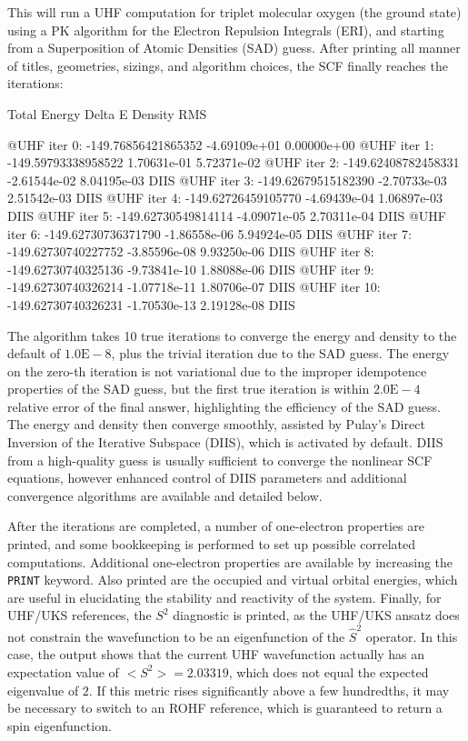 This will run a UHF computation for triplet molecular oxygen (the ground state)
using a PK algorithm for the Electron Repulsion Integrals (ERI), and starting
from a Superposition of Atomic Densities (SAD) guess. After printing all manner
of titles, geometries, sizings, and algorithm choices, the SCF finally reaches
the iterations:
\begin{Snippet}
                        Total Energy        Delta E     Density RMS

   @UHF iter   0:  -149.76856421865352   -4.69109e+01   0.00000e+00
   @UHF iter   1:  -149.59793338958522    1.70631e-01   5.72371e-02
   @UHF iter   2:  -149.62408782458331   -2.61544e-02   8.04195e-03 DIIS
   @UHF iter   3:  -149.62679515182390   -2.70733e-03   2.51542e-03 DIIS
   @UHF iter   4:  -149.62726459105770   -4.69439e-04   1.06897e-03 DIIS
   @UHF iter   5:  -149.62730549814114   -4.09071e-05   2.70311e-04 DIIS
   @UHF iter   6:  -149.62730736371790   -1.86558e-06   5.94924e-05 DIIS
   @UHF iter   7:  -149.62730740227752   -3.85596e-08   9.93250e-06 DIIS
   @UHF iter   8:  -149.62730740325136   -9.73841e-10   1.88088e-06 DIIS
   @UHF iter   9:  -149.62730740326214   -1.07718e-11   1.80706e-07 DIIS
   @UHF iter  10:  -149.62730740326231   -1.70530e-13   2.19128e-08 DIIS
\end{Snippet}
The algorithm takes 10 true iterations to converge the energy and density to the
default of $1.0\mathrm{E}-8$, plus the trivial iteration due to the SAD guess.
The energy on the zero-th iteration is not variational due to the improper
idempotence properties of the SAD guess, but the first true iteration is within
$2.0\mathrm{E}-4$ relative error of the final answer, highlighting the
efficiency of the SAD guess. The energy and density then converge smoothly,
assisted by Pulay's Direct Inversion of the Iterative Subspace (DIIS), which is
activated by default. DIIS from a high-quality guess is usually sufficient to
converge the nonlinear SCF equations, however enhanced control of DIIS
parameters and additional convergence algorithms are available and detailed
below. 

After the iterations are completed, a number of one-electron properties are
printed, and some bookkeeping is performed to set up possible correlated
computations. Additional one-electron properties are available by increasing the
\texttt{PRINT} keyword. Also printed are the occupied and virtual orbital
energies, which are useful in elucidating the stability and reactivity of the
system. Finally, for UHF/UKS references, the $S^2$ diagnostic is printed, as the
UHF/UKS ansatz does not constrain the wavefunction to be an eigenfunction of the
$\hat S^2$ operator. In this case, the output shows that the current UHF
wavefunction actually has an expectation value of $<S^2> = 2.03319$, which does
not equal the expected eigenvalue of $2$.  If this metric rises significantly
above a few hundredths, it may be necessary to switch to an ROHF reference,
which is guaranteed to return a spin eigenfunction. 
  
